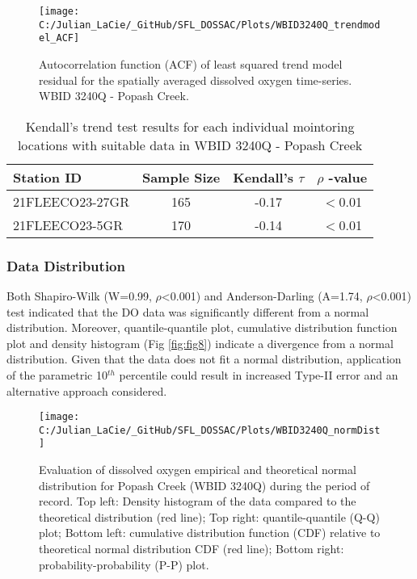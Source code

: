 \documentclass[]{interact}
\theoremstyle{plain}%
\theoremstyle{definition}
\theoremstyle{remark}
\begin{document}
\begin{figure}[H]

{\centering \texttt{[image: C:/Julian\_LaCie/\_GitHub/SFL\_DOSSAC/Plots/WBID3240Q\_trendmodel\_ACF]} 

}

\caption{\label{fig:fig7} Autocorrelation function (ACF) of least squared trend model residual for the spatially averaged dissolved oxygen time-series. WBID 3240Q - Popash Creek.}\label{fig:unnamed-chunk-11}
\end{figure}

\begin{table}[H]

\caption{\label{tab:unnamed-chunk-12}\label{tab:trendtab6} Kendall's trend test results for each individual mointoring locations with suitable data in WBID 3240Q - Popash Creek}
\centering
\fontsize{10}{12}\selectfont
\begin{tabular}[t]{lccc}
\toprule
Station ID & Sample Size & Kendall's $\tau$ & $\rho$ -value\\
\midrule
21FLEECO23-27GR & 165 & -0.17 & $<$0.01\\
21FLEECO23-5GR & 170 & -0.14 & $<$0.01\\
\bottomrule
\end{tabular}
\end{table}

\hypertarget{data-distribution-1}{%
\subsubsection{Data Distribution}\label{data-distribution-1}}

Both Shapiro-Wilk (W=0.99, \(\rho\)\textless0.001) and Anderson-Darling
(A=1.74, \(\rho\)\textless0.001) test indicated that the DO data was
significantly different from a normal distribution. Moreover,
quantile-quantile plot, cumulative distribution function plot and
density histogram (Fig \ref{fig:fig8}) indicate a divergence from a
normal distribution. Given that the data does not fit a normal
distribution, application of the parametric 10\(^{th}\) percentile could
result in increased Type-II error and an alternative approach
considered.

\begin{figure}[H]

{\centering \texttt{[image: C:/Julian\_LaCie/\_GitHub/SFL\_DOSSAC/Plots/WBID3240Q\_normDist]} 

}

\caption{\label{fig:fig8} Evaluation of dissolved oxygen empirical and theoretical normal distribution for Popash Creek (WBID 3240Q) during the period of record. Top left: Density histogram of the data compared to the theoretical distribution (red line); Top right: quantile-quantile (Q-Q) plot; Bottom left: cumulative distribution function (CDF) relative to theoretical normal distribution CDF (red line); Bottom right: probability-probability (P-P) plot.}\label{fig:unnamed-chunk-13}
\end{figure}
\end{document}
